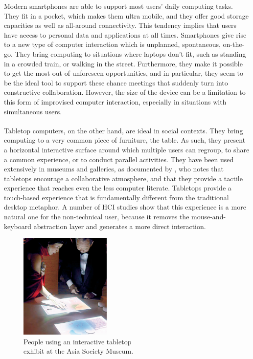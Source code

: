 Modern smartphones are able to support most users' daily computing tasks.
They fit in a pocket, which makes them ultra mobile, and they offer good storage capacities as well as all-around connectivity.
This tendency implies that users have access to personal data and applications at all times.
Smartphones give rise to a new type of computer interaction which is unplanned, spontaneous, on-the-go.
They bring computing to situations where laptops don't fit, such as standing in a crowded train, or walking in the street.
Furthermore, they make it possible to get the most out of unforeseen opportunities, and in particular, they seem to be the ideal tool to support these chance meetings that suddenly turn into constructive collaboration.
However, the size of the device can be a limitation to this form of improvised computer interaction, especially in situations with simultaneous users. 
\\\\
Tabletop computers, on the other hand, are ideal in social contexts.
They bring computing to a very common piece of furniture, the table.
As such, they present a horizontal interactive surface around which multiple users can regroup, to share a common experience, or to conduct parallel activities.
They have been used extensively in museums and galleries, as documented by \cite{Geller:2006:exhibits}, who notes that tabletops encourage a collaborative atmosphere, and that they provide a tactile experience that reaches even the less computer literate.
Tabletops provide a touch-based experience that is fundamentally different from the traditional desktop metaphor.
A number of HCI studies show that this experience is a more natural one for the non-technical user, because it removes the mouse-and-keyboard abstraction layer and generates a more direct interaction.

\begin{figure}[htb]
  \centering
    \includegraphics[width=0.4\textwidth]{images/visitors}
  \caption{People using an interactive tabletop\\exhibit at the Asia Society Museum.}
  \label{visitors}
\end{figure}

